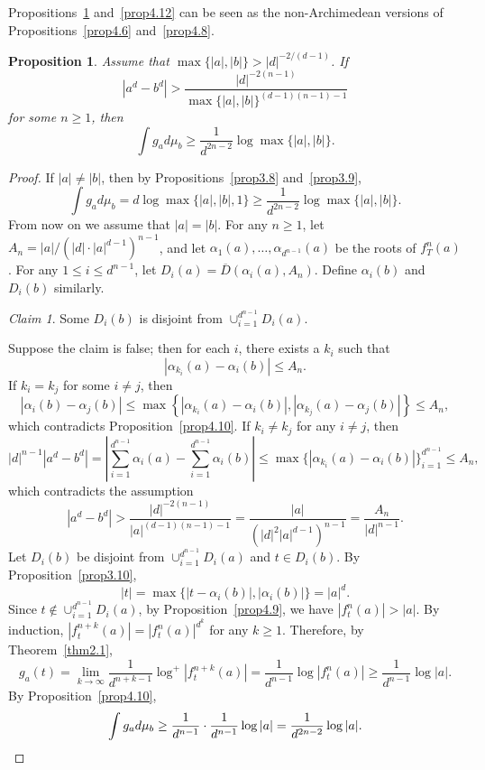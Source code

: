 \documentclass[10pt,a4paper]{amsart}
\numberwithin{equation}{section}
\theoremstyle{plain}
\newtheorem{prop}[thm]{Proposition}
\theoremstyle{definition}
\theoremstyle{remark}
\newtheorem*{claim*}{Claim}
\begin{document}
Propositions~\ref{prop4.11} and~\ref{prop4.12} can be seen as the
non-Archimedean versions of Propositions~\ref{prop4.6} and~\ref{prop4.8}.

\begin{prop}\label{prop4.11}
Assume that $\max\{|a|,|b|\}>|d|^{-2/(d-1)}$. If
\[
|a^{d}-b^{d}|>\frac{|d|^{-2(n-1)}}{\max\{|a|,|b|\}^{(d-1)(n-1)-1}} 
\]
for some $n\geq1$, then
\[
\int g_{a}d\mu_{b}\geq\frac{1}{d^{2n-2}}\log\max\{|a|,|b|\}.
\]
\end{prop}

\begin{proof}
If $|a|\neq|b|$, then by Propositions~\ref{prop3.8} and~\ref{prop3.9},
\[
\int g_{a}d\mu_{b}=d\log\max\{|a|,|b|,1\}\geq\frac{1}{d^{2n-2}}\log\max\{|a|,|b|\}.
\]
From now on we assume that $|a|=|b|$. For any $n\geq1$, let $A_{n}=|a|/(|d|\cdot|a|^{d-1})^{n-1}$,
and let $\alpha_{1}(a),\dots,\alpha_{d^{n-1}}(a)$ be the roots of
$f_{T}^{n}(a)$. For any $1\leq i\leq d^{n-1}$, let $D_{i}(a)=\overline{D}(\alpha_{i}(a),A_{n})$.
Define $\alpha_{i}(b)$ and $D_{i}(b)$ similarly.

\begin{claim*}
  Some $D_{i}(b)$ is disjoint from $\cup_{i=1}^{d^{n-1}}D_{i}(a)$.
\end{claim*}

Suppose the claim is false; then for each $i$, there exists a $k_{i}$ such that
\[
|\alpha_{k_{i}}(a)-\alpha_{i}(b)|\leq A_{n}.
\]
If $k_{i}=k_{j}$ for some $i\neq j$, then
\[
|\alpha_{i}(b)-\alpha_{j}(b)|\leq\max\left\{\left|\alpha_{k_{i}}(a)-\alpha_{i}(b)\right|,\left|\alpha_{k_{j}}(a)-\alpha_{j}(b)\right|\right\}\leq A_{n},
\]
which contradicts Proposition~\ref{prop4.10}. If $k_{i}\neq k_{j}$
for any $i\neq j$, then
\[
|d|^{n-1}\left|a^{d}-b^{d}\right|=\left|\sum_{i=1}^{d^{n-1}}\alpha_{i}(a)-\sum_{i=1}^{d^{n-1}}\alpha_{i}(b)\right|\leq\max\{|\alpha_{k_{i}}(a)-\alpha_{i}(b)|\}_{i=1}^{d^{n-1}}\leq A_{n},
\]
which contradicts the assumption
\[
\left|a^{d}-b^{d}\right|>\frac{|d|^{-2(n-1)}}{|a|^{(d-1)(n-1)-1}}=\frac{|a|}{\left(|d|^{2}|a|^{d-1}\right)^{n-1}}=\frac{A_{n}}{|d|^{n-1}}.
\]
Let $D_{i}(b)$ be disjoint from $\cup_{i=1}^{d^{n-1}}D_{i}(a)$ and
$t\in D_{i}(b)$. By Proposition~\ref{prop3.10},
\[
|t|=\max\{|t-\alpha_{i}(b)|,|\alpha_{i}(b)|\}=|a|^{d}.
\]
Since $t\notin\cup_{i=1}^{d^{n-1}}D_{i}(a)$, by Proposition~\ref{prop4.9},
we have $|f_{t}^{n}(a)|>|a|$. By induction, $|f_{t}^{n+k}(a)|=|f_{t}^{n}(a)|^{d^{k}}$
for any $k\geq1$. Therefore, by Theorem~\ref{thm2.1},
\[
g_{a}(t)=\lim_{k\to\infty}\frac{1}{d^{n+k-1}}\log^{+}\left|f_{t}^{n+k}(a)\right|=\frac{1}{d^{n-1}}\log\left|f_{t}^{n}(a)\right|\geq\frac{1}{d^{n-1}}\log|a|.
\]
By Proposition~\ref{prop4.10},
\[
\int g_{a}d\mu_{b}\geq\frac{1}{d^{n-1}}\cdot\frac{1}{d^{n-1}}\log|a|=\frac{1}{d^{2n-2}}\log|a|.\qedhere
\]
\end{proof}
\end{document}
